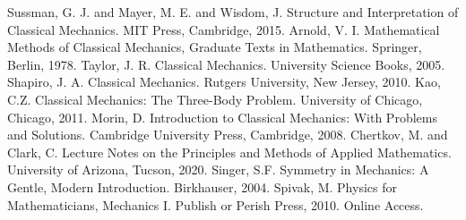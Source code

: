 \documentclass[10pt, psamsfonts]{amsart}
\theoremstyle{definition}
\theoremstyle{remark}
\numberwithin{equation}{section}
\begin{document}
\begin{thebibliography}{9}
 \label{b1}
        Sussman, G. J. and Mayer, M. E. and Wisdom, J. Structure and Interpretation of Classical Mechanics. MIT Press, Cambridge, 2015. 
 \label{b2}
        Arnold, V. I. Mathematical Methods of Classical Mechanics, Graduate Texts in Mathematics. Springer, Berlin, 1978.
 \label{b2}
        Taylor, J. R. Classical Mechanics. University Science Books, 2005.
 \label{bh}
        Shapiro, J. A. Classical Mechanics. Rutgers University, New Jersey, 2010.
 \label{b3}
        Kao, C.Z. Classical Mechanics: The Three-Body Problem. University of Chicago, Chicago, 2011.
 \label{b4}
        Morin, D. Introduction to Classical Mechanics: With Problems and Solutions. Cambridge University Press, Cambridge, 2008.
 \label{b5}
        Chertkov, M. and Clark, C. Lecture Notes on the Principles and Methods of Applied Mathematics. University of Arizona, Tucson, 2020.
 \label{b5}
        Singer, S.F. Symmetry in Mechanics: A Gentle, Modern Introduction. Birkhauser, 2004.
        Spivak, M. Physics for Mathematicians, Mechanics I. Publish or Perish Press, 2010. Online Access.
\end{thebibliography}
\end{document}
